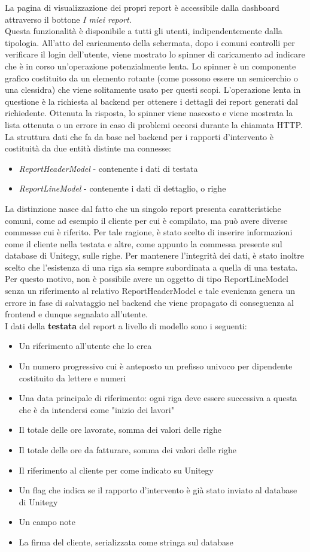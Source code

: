 La pagina di visualizzazione dei propri report è accessibile dalla dashboard attraverso il bottone \emph{I miei report}.
\\
Questa funzionalità è disponibile a tutti gli utenti, indipendentemente dalla tipologia.
All'atto del caricamento della schermata, dopo i comuni controlli per verificare il login dell'utente, viene mostrato lo spinner di caricamento ad indicare che è in corso 
un'operazione potenzialmente lenta.
Lo spinner è un componente grafico costituito da un elemento rotante (come possono essere un semicerchio o una clessidra) che viene solitamente usato per questi scopi.
L'operazione lenta in questione è la richiesta al backend per ottenere i dettagli dei report generati dal richiedente.
Ottenuta la risposta, lo spinner viene nascosto e viene mostrata la lista ottenuta o un errore in caso di problemi occorsi durante la chiamata HTTP.
La struttura dati che fa da base nel backend per i rapporti d'intervento è costituità da due entità distinte ma connesse:
\begin{itemize}
    \item \emph{ReportHeaderModel} - contenente i dati di testata
    \item \emph{ReportLineModel} - contenente i dati di dettaglio, o righe
\end{itemize}
La distinzione nasce dal fatto che un singolo report presenta caratteristiche comuni, come ad esempio il cliente per cui è compilato, ma può avere diverse commesse cui è riferito.
Per tale ragione, è stato scelto di inserire informazioni come il cliente nella testata e altre, come appunto la commessa presente sul database di Unitegy, sulle righe.
Per mantenere l'integrità dei dati, è stato inoltre scelto che l'esistenza di una riga sia sempre subordinata a quella di una testata.
Per questo motivo, non è possibile avere un oggetto di tipo ReportLineModel senza un riferimento al relativo ReportHeaderModel e tale evenienza genera un errore in fase di salvataggio
nel backend che viene propagato di conseguenza al frontend e dunque segnalato all'utente.
\\
I dati della \textbf{testata} del report a livello di modello sono i seguenti:
\begin{itemize}
    \item Un riferimento all'utente che lo crea
    \item Un numero progressivo cui è anteposto un prefisso univoco per dipendente costituito da lettere e numeri
    \item Una data principale di riferimento: ogni riga deve essere successiva a questa che è da intendersi come "inizio dei lavori"
    \item Il totale delle ore lavorate, somma dei valori delle righe
    \item Il totale delle ore da fatturare, somma dei valori delle righe
    \item Il riferimento al cliente per come indicato su Unitegy
    \item Un flag che indica se il rapporto d'intervento è già stato inviato al database di Unitegy
    \item Un campo note
    \item La firma del cliente, serializzata come stringa sul database
\end{itemize}
